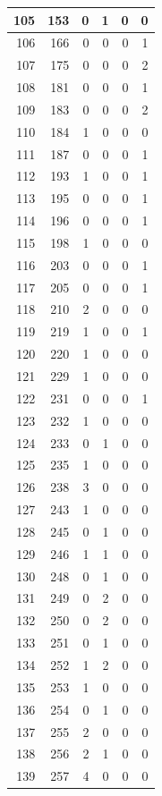 \documentclass[
  letterpaper,
  DIV=11,
  numbers=noendperiod]{scrreprt}
\begin{document}
\begin{tabular}{r|r|r|r|r|r}
\hline
105 & 153 & 0 & 1 & 0 & 0\\
\hline
106 & 166 & 0 & 0 & 0 & 1\\
\hline
107 & 175 & 0 & 0 & 0 & 2\\
\hline
108 & 181 & 0 & 0 & 0 & 1\\
\hline
109 & 183 & 0 & 0 & 0 & 2\\
\hline
110 & 184 & 1 & 0 & 0 & 0\\
\hline
111 & 187 & 0 & 0 & 0 & 1\\
\hline
112 & 193 & 1 & 0 & 0 & 1\\
\hline
113 & 195 & 0 & 0 & 0 & 1\\
\hline
114 & 196 & 0 & 0 & 0 & 1\\
\hline
115 & 198 & 1 & 0 & 0 & 0\\
\hline
116 & 203 & 0 & 0 & 0 & 1\\
\hline
117 & 205 & 0 & 0 & 0 & 1\\
\hline
118 & 210 & 2 & 0 & 0 & 0\\
\hline
119 & 219 & 1 & 0 & 0 & 1\\
\hline
120 & 220 & 1 & 0 & 0 & 0\\
\hline
121 & 229 & 1 & 0 & 0 & 0\\
\hline
122 & 231 & 0 & 0 & 0 & 1\\
\hline
123 & 232 & 1 & 0 & 0 & 0\\
\hline
124 & 233 & 0 & 1 & 0 & 0\\
\hline
125 & 235 & 1 & 0 & 0 & 0\\
\hline
126 & 238 & 3 & 0 & 0 & 0\\
\hline
127 & 243 & 1 & 0 & 0 & 0\\
\hline
128 & 245 & 0 & 1 & 0 & 0\\
\hline
129 & 246 & 1 & 1 & 0 & 0\\
\hline
130 & 248 & 0 & 1 & 0 & 0\\
\hline
131 & 249 & 0 & 2 & 0 & 0\\
\hline
132 & 250 & 0 & 2 & 0 & 0\\
\hline
133 & 251 & 0 & 1 & 0 & 0\\
\hline
134 & 252 & 1 & 2 & 0 & 0\\
\hline
135 & 253 & 1 & 0 & 0 & 0\\
\hline
136 & 254 & 0 & 1 & 0 & 0\\
\hline
137 & 255 & 2 & 0 & 0 & 0\\
\hline
138 & 256 & 2 & 1 & 0 & 0\\
\hline
139 & 257 & 4 & 0 & 0 & 0\\

\end{tabular}
\end{document}
